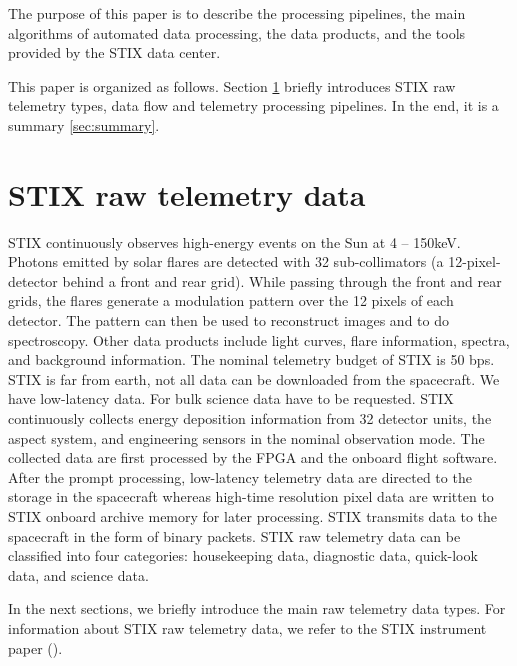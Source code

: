 \documentclass[referee]{aa} %
\begin{document}
The purpose of this paper is to describe the processing pipelines, 
the main algorithms of automated data processing, the data products, and the tools provided by the STIX data center.


This paper is organized as follows. Section \ref{sec:raw-data} briefly introduces STIX raw telemetry types, data flow and
telemetry processing pipelines. 
In the end, it is a summary \ref{sec:summary}.
\section{STIX raw telemetry data}
\label{sec:raw-data}
STIX continuously observes high-energy events on the Sun at 4 -- 150keV. 
Photons emitted by solar flares are detected with 32 sub-collimators 
(a 12-pixel-detector behind a front and rear grid). While passing through the front and rear grids, 
the flares generate a modulation pattern over the 12 pixels of each detector. 
The pattern can then be used to reconstruct images and to do spectroscopy. 
Other data products include light curves, flare information, spectra, and background information.
The nominal telemetry budget of STIX is 50 bps.
STIX is far from earth, not all data can be downloaded from the spacecraft. We have low-latency data.
For bulk science data have to be requested.
STIX continuously collects energy deposition information from 32 detector units, the aspect system,
and engineering sensors in the nominal observation mode.
The collected data are first processed by the FPGA and the onboard flight software.
After the prompt processing, low-latency telemetry data are directed to the
storage in the spacecraft whereas high-time resolution pixel data are written to STIX onboard archive memory for
later processing.
STIX transmits data to the spacecraft in the form of binary packets.
STIX raw telemetry data can be classified into four
categories: housekeeping data, diagnostic data, quick-look data, and science data.

In the next sections, we briefly introduce the main raw telemetry data types.
For information about STIX raw telemetry data, we refer to the STIX instrument paper (\cite{StixInstrument}).
\end{document}
